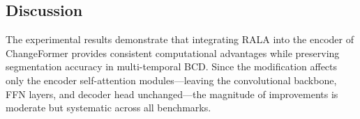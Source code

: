 \documentclass[runningheads]{llncs}
\newcommand{\journal}[1]{{\color{orange}#1}}
\begin{document}
\begin{table}[h!]
\caption{\journal{Comparison between the ChangeFormer baseline and the proposed method across the four extended benchmarks (LEVIR-CD+, SYSU-CD, WHU-CD, and S2Looking). All values are reported in \% \cite{acuna2026efficient}.}}
\label{tab:master}
\centering
{}
\end{table}

\subsection{Discussion}
\label{sec:discussion}

The experimental results demonstrate that integrating RALA into the encoder of
ChangeFormer provides consistent computational advantages while preserving
segmentation accuracy in multi-temporal BCD. Since the modification affects only
the encoder self-attention modules—leaving the convolutional backbone, FFN
layers, and decoder head unchanged—the magnitude of improvements is moderate
but systematic across all benchmarks.
\end{document}
